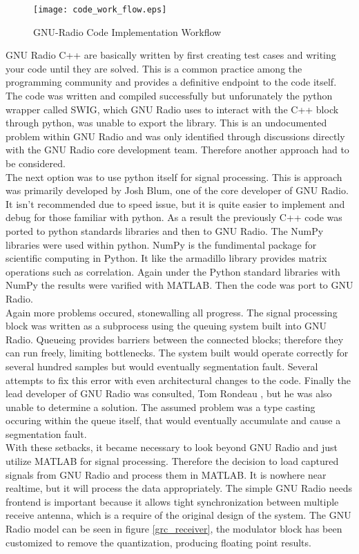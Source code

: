 \begin{figure}[!ht] 
\centering
\texttt{[image: code\_work\_flow.eps]}
\caption{GNU-Radio Code Implementation Workflow}
\end{figure}

GNU Radio C++ are basically written by first creating test cases and writing your code until they are solved.  This is a common practice among the programming community and provides a definitive endpoint to the code itself.  The code was written and compiled successfully but unforunately the python wrapper called SWIG\cite{swig}, which GNU Radio uses to interact with the C++ block through python, was unable to export the library.  This is an undocumented problem within GNU Radio and was only identified through discussions directly with the GNU Radio core development team.  Therefore another approach had to be considered.\\

The next option was to use python itself for signal processing.  This is approach was primarily developed by Josh Blum, one of the core developer of GNU Radio.  It isn't recommended due to speed issue, but it is quite easier to implement and debug for those familiar with python.  As a result the previously C++ code was ported to python standards libraries and then to GNU Radio.  The NumPy libraries were used within python.  NumPy is the fundimental package for scientific computing in Python\cite{numpy}.  It like the armadillo library provides matrix operations such as correlation.  Again under the Python standard libraries with NumPy the results were varified with MATLAB.  Then the code was port to GNU Radio.\\

Again more problems occured, stonewalling all progress.  The signal processing block was written as a subprocess using the queuing system built into GNU Radio.  Queueing provides barriers between the connected blocks; therefore they can run freely, limiting bottlenecks. The system built would operate correctly for several hundred samples but would eventually segmentation fault.  Several attempts to fix this error with even architectural changes to the code.  Finally the lead developer of GNU Radio was consulted, Tom Rondeau \cite{tomrondeau}, but he was also unable to determine a solution.  The assumed problem was a type casting occuring within the queue itself, that would eventually accumulate and cause a segmentation fault.\\

With these setbacks, it became necessary to look beyond GNU Radio and just utilize MATLAB for signal processing.  Therefore the decision to load captured signals from GNU Radio and process them in MATLAB.  It is nowhere near realtime, but it will process the data appropriately.  The simple GNU Radio needs frontend is important because it allows tight synchronization between multiple receive antenna, which is a require of the original design of the system.  The GNU Radio model can be seen in figure \ref{grc_receiver}, the modulator block has been customized to remove the quantization, producing floating point results.\\

